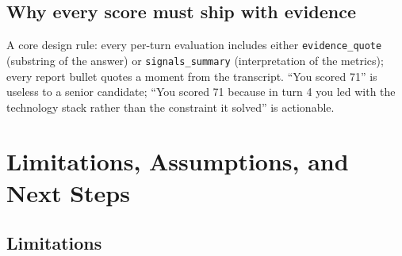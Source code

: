 \documentclass[11pt,a4paper]{article}
\begin{document}
\subsection{Why every score must ship with evidence}

A core design rule: every per-turn evaluation includes either
\texttt{evidence\_quote} (substring of the answer) or
\texttt{signals\_summary} (interpretation of the metrics); every report
bullet quotes a moment from the transcript. ``You scored 71'' is useless
to a senior candidate; ``You scored 71 because in turn 4 you led with
the technology stack rather than the constraint it solved'' is actionable.

\section{Limitations, Assumptions, and Next Steps}\label{sec:future}

\subsection{Limitations}
\end{document}
